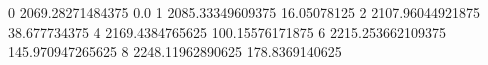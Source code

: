 0 2069.28271484375 0.0
1 2085.33349609375 16.05078125
2 2107.96044921875 38.677734375
4 2169.4384765625 100.15576171875
6 2215.253662109375 145.970947265625
8 2248.11962890625 178.8369140625

